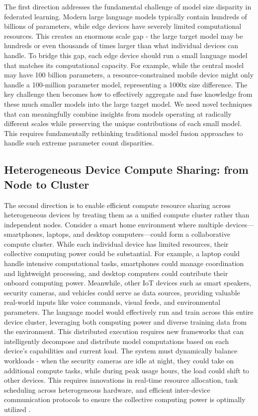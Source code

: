 The first direction addresses the fundamental challenge of model size disparity in federated learning. Modern large language models typically contain hundreds of billions of parameters, while edge devices have severely limited computational resources. This creates an enormous scale gap - the large target model may be hundreds or even thousands of times larger than what individual devices can handle. To bridge this gap, each edge device should run a small language model that matches its computational capacity. For example, while the central model may have 100 billion parameters, a resource-constrained mobile device might only handle a 100-million parameter model, representing a 1000x size difference. 
The key challenge then becomes how to effectively aggregate and fuse knowledge from these much smaller models into the large target model. 
We need novel techniques that can meaningfully combine insights from models operating at radically different scales while preserving the unique contributions of each small model. This requires fundamentally rethinking traditional model fusion approaches \citep{velasevic2023effects,azizan2019distributed} to handle such extreme parameter count disparities.

\subsection{Heterogeneous Device Compute Sharing: from Node to Cluster}\label{subsec:compute_sharing}

The second direction is to enable efficient compute resource sharing across heterogeneous devices by treating them as a unified compute cluster rather than independent nodes. Consider a smart home environment where multiple devices—smartphones, laptops, and desktop computers—could form a collaborative compute cluster. While each individual device has limited resources, their collective computing power could be substantial. For example, a laptop could handle intensive computational tasks, smartphones could manage coordination and lightweight processing, and desktop computers could contribute their onboard computing power. Meanwhile, other IoT devices such as smart speakers, security cameras, and vehicles could serve as data sources, providing valuable real-world inputs like voice commands, visual feeds, and environmental parameters. The language model would effectively run and train across this entire device cluster, leveraging both computing power and diverse training data from the environment.
This distributed execution requires new frameworks that can intelligently decompose and distribute model computations based on each device's capabilities and current load. The system must dynamically balance workloads - when the security cameras are idle at night, they could take on additional compute tasks, while during peak usage hours, the load could shift to other devices. 
This requires innovations in real-time resource allocation, task scheduling across heterogeneous hardware, and efficient inter-device communication protocols to ensure the collective computing power is optimally utilized \citep{zhao2024retrieval}.

